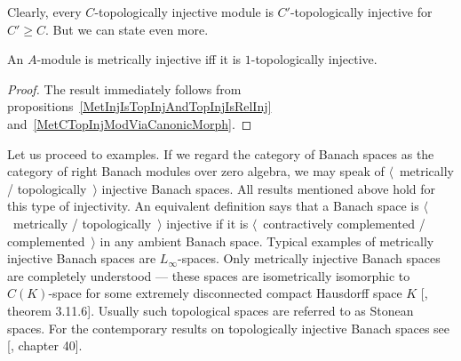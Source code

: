 Clearly, every $C$-topologically injective module is $C'$-topologically 
injective for $C'\geq C$. But we can state even more.

\begin{proposition}\label{MetInjIsOneTopInj} An $A$-module is metrically
injective iff it is $1$-topologically injective.
\end{proposition}
\begin{proof} The result immediately follows 
from propositions~\ref{MetInjIsTopInjAndTopInjIsRelInj} 
and~\ref{MetCTopInjModViaCanonicMorph}.
\end{proof}

Let us proceed to examples. If we regard the category of Banach spaces as the
category of right Banach modules over zero algebra, we may speak of
$\langle$~metrically / topologically~$\rangle$ injective Banach spaces. All
results mentioned above hold for this type of injectivity. An equivalent
definition says that a Banach space is $\langle$~metrically /
topologically~$\rangle$ injective if it is $\langle$~contractively complemented
/ complemented~$\rangle$ in any ambient Banach space. Typical examples of
metrically injective Banach spaces are $L_\infty$-spaces. Only metrically
injective Banach spaces are completely understood --- these spaces are
isometrically isomorphic to $C(K)$-space for some extremely disconnected compact
Hausdorff space $K$ [\cite{LaceyIsomThOfClassicBanSp}, theorem 3.11.6]. Usually
such topological spaces are referred to as Stonean spaces.  For the contemporary
results on topologically injective Banach spaces see
[\cite{JohnLinHandbookGeomBanSp}, chapter 40].

